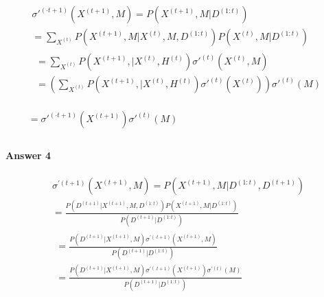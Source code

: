 \documentclass[12pt]{article}
\begin{document}
\[\begin{array}{l}
 \begin{array}{*{20}{c}}
   {\sigma {'^{(\cdot t + 1)}}({X^{(t + 1)}},M) = P({X^{(t + 1)}},M|{D^{(1:t)}})}  \\
   { = \sum\limits_{{X^{(t)}}} {P({X^{(t + 1)}},M|{X^{(t)}},M,{D^{(1:t)}})} P({X^{(t)}},M|{D^{(1:t)}})}  \\
   \begin{array}{l}
  = \sum\limits_{{X^{(t)}}} {P({X^{(t + 1)}},|{X^{(t)}},{H^{(t)}})\sigma {'^{(t)}}({X^{(t)}},M)}  \\ 
  = \left( {\sum\limits_{{X^{(t)}}} {P({X^{(t + 1)}},|{X^{(t)}},{H^{(t)}})\sigma {'^{(t)}}({X^{(t)}})} } \right)\sigma {'^{(t)}}(M) \\ 
 \end{array}  \\
\end{array} \\ 
  = \sigma {'^{(\cdot t + 1)}}({X^{(t + 1)}})\sigma {'^{(t)}}(M) \\ 
 \end{array}\]
 
\paragraph{Answer 4}

\[\begin{array}{*{20}{c}}
   {{\sigma ^{'(t + 1)}}({X^{(t + 1)}},M) = P({X^{(t + 1)}},M|{D^{(1:t)}},{D^{(t + 1)}})}  \\
   { = \frac{{P({D^{(t + 1)}}|{X^{(t + 1)}},M,{D^{(1:t)}})P({X^{(t + 1)}},M|{D^{(1:t)}})}}{{P({D^{(t + 1)}}|{D^{(1:t)}})}}}  \\
   \begin{array}{l}
  = \frac{{P({D^{(t + 1)}}|{X^{(t + 1)}},M){\sigma ^{'(\cdot t + 1)}}({X^{(t + 1)}},M)}}{{P({D^{(t + 1)}}|{D^{(1:t)}})}} \\ 
  = \frac{{P({D^{(t + 1)}}|{X^{(t + 1)}},M){\sigma ^{'(.t + 1)}}({X^{(t + 1)}}){\sigma ^{'(t)}}(M)}}{{P({D^{(t + 1)}}|{D^{(1:t)}})}} \\ 
 \end{array}  \\
\end{array}\]
\\
\end{document}
